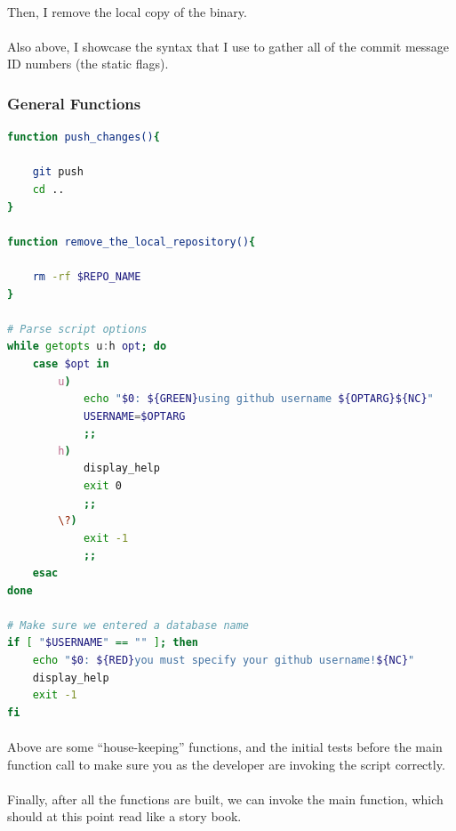 \documentclass[11pt]{article}
\begin{document}
	\paragraph{} Then, I remove the local copy of the binary.

	\paragraph{} Also above, I showcase the syntax that I use to gather all of the commit message ID numbers (the static flags).

	\newpage


		\subsubsection{General Functions}

	\begin{lstlisting}[language=bash]
function push_changes(){

	git push
	cd ..
}

function remove_the_local_repository(){

	rm -rf $REPO_NAME
}

# Parse script options
while getopts u:h opt; do
	case $opt in
		u)
			echo "$0: ${GREEN}using github username ${OPTARG}${NC}"
			USERNAME=$OPTARG
			;;
		h)
			display_help
			exit 0
			;;
		\?)
			exit -1
			;;
	esac
done

# Make sure we entered a database name
if [ "$USERNAME" == "" ]; then
	echo "$0: ${RED}you must specify your github username!${NC}"
	display_help
	exit -1
fi
	\end{lstlisting}	

	\paragraph{}

	\paragraph{} Above are some ``house-keeping'' functions, and the initial tests before the main function call to make sure you as the developer are invoking the script correctly.

	\paragraph{} Finally, after all the functions are built, we can invoke the main function, which should at this point read like a story book.
\end{document}
